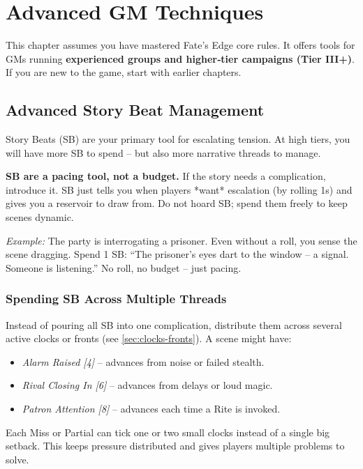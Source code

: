 \chapter{Advanced GM Techniques}
\label{ch:gm-advanced}

This chapter assumes you have mastered Fate’s Edge core rules. It offers tools for GMs running \textbf{experienced groups and higher‑tier campaigns (Tier III+)}. If you are new to the game, start with earlier chapters.

\section{Advanced Story Beat Management}

Story Beats (SB) are your primary tool for escalating tension. At high tiers, you will have more SB to spend – but also more narrative threads to manage.

\begin{tcolorbox}[
  colback=blue!5!white,
  colframe=blue!75!black,
  title=You Are Not Limited by SB,
  fonttitle=\bfseries
]
\textbf{SB are a pacing tool, not a budget.} If the story needs a complication, introduce it. SB just tells you when players *want* escalation (by rolling 1s) and gives you a reservoir to draw from. Do not hoard SB; spend them freely to keep scenes dynamic.

\medskip
\noindent\textit{Example:} The party is interrogating a prisoner. Even without a roll, you sense the scene dragging. Spend 1 SB: “The prisoner’s eyes dart to the window – a signal. Someone is listening.” No roll, no budget – just pacing.
\end{tcolorbox}

\subsection*{Spending SB Across Multiple Threads}
Instead of pouring all SB into one complication, distribute them across several active clocks or fronts (see \ref{sec:clocks-fronts}). A scene might have:
\begin{itemize}
  \item \emph{Alarm Raised [4]} – advances from noise or failed stealth.
  \item \emph{Rival Closing In [6]} – advances from delays or loud magic.
  \item \emph{Patron Attention [8]} – advances each time a Rite is invoked.
\end{itemize}
Each Miss or Partial can tick one or two small clocks instead of a single big setback. This keeps pressure distributed and gives players multiple problems to solve.

